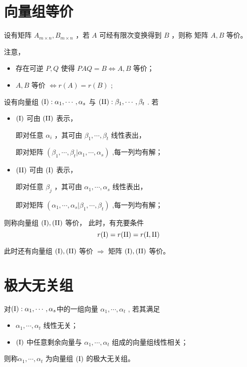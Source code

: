 \section{向量组等价}


设有矩阵 $ A_{m\times n},B_{m\times n} $ ，若 $ A $ 可经有限次变换得到 $ B $ ，则称
矩阵 $ A,B $ 等价。

注意，
\begin{itemize}
    \item 存在可逆 $ P,Q $ 使得 $ PAQ = B \Leftrightarrow A,B $ 等价；
    \item $ A,B $ 等价 $ \Leftrightarrow r(A) = r(B) $ ;
\end{itemize}


设有向量组 $ {\rm (I)}: \alpha_1,\cdots,\alpha_s $ 与 $ {\rm (II)}: \beta_1,\cdots,\beta_t $ .
若
\begin{itemize}
    \item $ \rm (I) $ 可由 $ \rm (II) $ 表示，
    
    即对任意 $ \alpha_i $ ，其可由 $ \beta_1,\cdots,\beta_t $ 线性表出，

    即对矩阵 $ (\beta_1,\cdots,\beta_t|\alpha_1,\cdots,\alpha_s) $ ,每一列均有解；
    \item $ \rm (II) $ 可由 $ \rm (I) $ 表示，
    
    即对任意 $ \beta_j $ ，其可由 $ \alpha_1,\cdots,\alpha_s $ 线性表出，

    即对矩阵 $ (\alpha_1,\cdots,\alpha_s|\beta_1,\cdots,\beta_t) $ ,每一列均有解；
\end{itemize}

则称向量组 $ \rm (I),\rm (II) $ 等价，
此时，有充要条件$$
    r({\rm I}) = r({\rm II}) = r({\rm I,II})
$$ 

此时还有向量组 $ \rm (I),\rm (II) $ 等价 $ \Rightarrow $ 
矩阵 $ \rm (I),\rm (II) $ 等价。

\section{极大无关组}


对$ {\rm (I)}: \alpha_1,\cdots,\alpha_s $中的一组向量 $ \alpha_1,\cdots,\alpha_t $ ,
若其满足
\begin{itemize}
    \item $ \alpha_1,\cdots,\alpha_t $ 线性无关；
    \item $ \rm (I) $ 中任意剩余向量与 $ \alpha_1,\cdots,\alpha_t $ 
    组成的向量组线性相关；
\end{itemize}
则称$ \alpha_1,\cdots,\alpha_t $ 为向量组 $ \rm (I) $ 的极大无关组。

